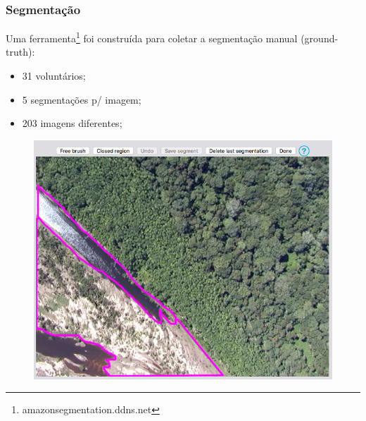 \documentclass[t]{beamer}
\begin{document}
\begin{frame}[c]
	\frametitle{Segmentação}

	Uma ferramenta\footnote{amazonsegmentation.ddns.net} foi construída para coletar a segmentação manual (ground-truth):


	\begin{minipage}{0.49\linewidth}
		\begin{itemize}
			\item 31 voluntários;
			\item 5 segmentações p/ imagem;
			\item 203 imagens diferentes;
		\end{itemize}
	\end{minipage}
	\begin{minipage}[r]{0.49\linewidth}
		\begin{figure}[h]
			\includegraphics[width=\textwidth]{imgs/manualseg}
		\end{figure}
	\end{minipage}
\end{frame}
\end{document}
